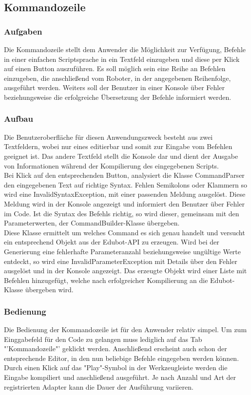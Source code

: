 
\subsection{Kommandozeile}

\subsubsection{Aufgaben}
Die Kommandozeile stellt dem Anwender die Möglichkeit zur Verfügung, Befehle in einer einfachen Scriptsprache in ein Textfeld einzugeben und diese per Klick auf einen Button auszuführen. Es soll möglich sein eine Reihe an Befehlen einzugeben, die anschließend vom Roboter, in der angegebenen Reihenfolge, ausgeführt werden. Weiters soll der Benutzer in einer Konsole über Fehler beziehungsweise die erfolgreiche Übersetzung der Befehle informiert werden.

\subsubsection{Aufbau}
Die Benutzeroberfläche für diesen Anwendungszweck besteht aus zwei Textfeldern, wobei nur eines editierbar und somit zur Eingabe vom Befehlen geeignet ist. Das andere Textfeld stellt die Konsole dar und dient der Ausgabe von Informationen während der Kompilierung des eingegebenen Scripts. \\
Bei Klick auf den entsprechenden Button, analysiert die Klasse CommandParser den eingegebenen Text auf richtige Syntax. Fehlen Semikolons oder Klammern so wird eine InvalidSyntaxException, mit einer passenden Meldung ausgelöst. Diese Meldung wird in der Konsole angezeigt und informiert den Benutzer über Fehler im Code. Ist die Syntax des Befehls richtig, so wird dieser, gemeinsam mit den Parameterwerten, der CommandBuilder-Klasse übergeben.\\
Diese Klasse ermittelt um welches Command es sich genau handelt und versucht ein entsprechend Objekt aus der Edubot-API zu erzeugen. Wird bei der Generierung eine fehlerhafte Parameteranzahl beziehungsweise ungültige Werte entdeckt, so wird eine InvalidParameterException mit Details über den Fehler ausgelöst und in der Konsole angezeigt. Das erzeugte Objekt wird einer Liste mit Befehlen hinzugefügt, welche nach erfolgreicher Kompilierung an die Edubot-Klasse übergeben wird.

\subsubsection{Bedienung}
Die Bedienung der Kommandozeile ist für den Anwender relativ simpel. Um zum Einggabefeld für den Code zu gelangen muss lediglich auf das Tab "'Kommandozeile"' geklickt werden. Anschließend erscheint auch schon der entsprechende Editor, in den nun beliebige Befehle eingegeben werden können. Durch einen Klick auf das "Play"-Symbol in der Werkzeugleiste werden die Eingabe kompiliert und anschließend ausgeführt. Je nach Anzahl und Art der registrierten Adapter kann die Dauer der Ausführung variieren.

